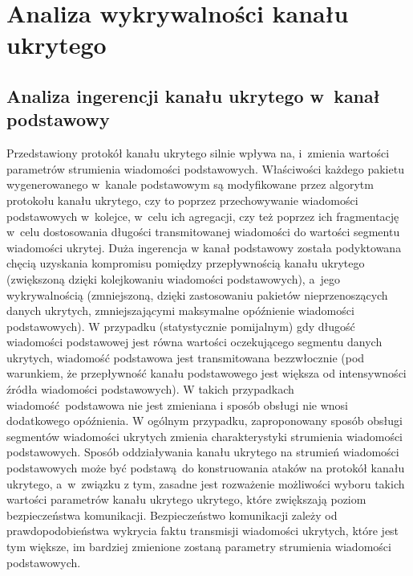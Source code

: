 \documentclass[a4paper, twoside, 12pt]{report}
\begin{document}
\chapter{Analiza wykrywalności kanału ukrytego}
    \section{Analiza ingerencji kanału ukrytego w~kanał podstawowy}
        Przedstawiony protokół kanału ukrytego silnie wpływa na, i~zmienia
        wartości parametrów strumienia wiadomości podstawowych. Właściwości każdego pakietu wygenerowanego
        w~kanale podstawowym są modyfikowane przez algorytm protokołu kanału ukrytego,
        czy to poprzez przechowywanie wiadomości podstawowych w~kolejce, w~celu
        ich agregacji, czy też
        poprzez ich fragmentację w~celu dostosowania długości transmitowanej wiadomości
        do wartości segmentu wiadomości ukrytej. Duża ingerencja w kanał podstawowy
        została podyktowana chęcią uzyskania kompromisu pomiędzy przepływnością
        kanału ukrytego (zwiększoną dzięki kolejkowaniu wiadomości podstawowych),
        a~jego wykrywalnością (zmniejszoną, dzięki zastosowaniu pakietów nieprzenoszących danych ukrytych,
        zmniejszającymi maksymalne opóźnienie wiadomości podstawowych).
        W przypadku (statystycznie pomijalnym) gdy długość wiadomości podstawowej
        jest równa wartości oczekującego segmentu danych ukrytych, wiadomość podstawowa
        jest transmitowana bezzwłocznie (pod warunkiem, że przepływność kanału podstawowego
        jest większa od intensywności źródła wiadomości podstawowych). W takich przypadkach
        wiadomość podstawowa nie jest zmieniana i sposób obsługi nie wnosi dodatkowego
        opóźnienia. W ogólnym przypadku, zaproponowany sposób obsługi segmentów wiadomości
        ukrytych zmienia charakterystyki strumienia wiadomości podstawowych.
        Sposób oddziaływania kanału ukrytego na strumień wiadomości podstawowych
        może być podstawą do konstruowania ataków na protokół kanału ukrytego,
        a~w~związku z tym, zasadne jest rozważenie możliwości wyboru takich wartości
        parametrów kanału ukrytego ukrytego, które zwiększają poziom bezpieczeństwa
        komunikacji. Bezpieczeństwo komunikacji zależy od prawdopodobieństwa
        wykrycia faktu transmisji wiadomości ukrytych, które jest tym większe,
        im bardziej zmienione zostaną parametry strumienia wiadomości podstawowych.
\end{document}

